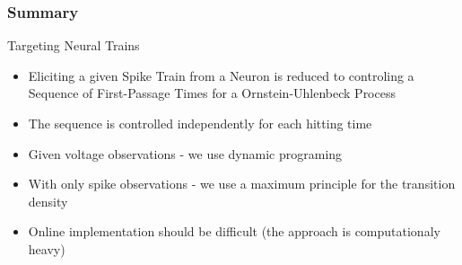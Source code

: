 \documentclass{beamer}
\begin{document}
\begin{frame}
\frametitle<presentation>{Summary}
\begin{block}{Targeting Neural Trains}
  \begin{itemize}
    \item Eliciting a given Spike Train from a Neuron is reduced to controling a
    Sequence of First-Passage Times for a Ornstein-Uhlenbeck Process \pause
    \item The sequence is controlled independently for each hitting time \pause
	\item Given voltage observations - we use dynamic programing \pause
	\item With only spike observations - we use a maximum principle for the
	transition density \pause
	\item Online implementation should be difficult (the approach is
	computationaly heavy) 
  \end{itemize}
\end{block}



\end{frame}
\end{document}
